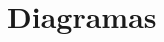 \chapter[Diagramas]{
  \label{chp:diagramas}
  Diagramas
}
\thispagestyle{numberingStyle}
\pagestyle{numberingStyle}